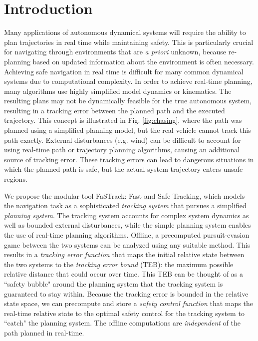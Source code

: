 \section{Introduction}
Many applications of autonomous dynamical systems will require the ability to plan trajectories in real time while maintaining safety.  
This is particularly crucial for navigating through environments that are \textit{a priori} unknown, because re-planning based on updated information about the environment is often necessary. 
Achieving safe navigation in real time is difficult for many common dynamical systems due to computational complexity.
 In order to achieve real-time planning, many algorithms use highly simplified model dynamics or kinematics.  The resulting plans may not be dynamically feasible for the true autonomous system, resulting in a tracking error between the planned path and the executed trajectory.
 This concept is illustrated in Fig. \ref{fig:chasing}, where the path was planned using a simplified planning model, but the real vehicle cannot track this path exactly. 
External disturbances (e.g. wind) can be difficult to account for using real-time path or trajectory planning algorithms, causing an additional source of tracking error. 
These tracking errors can lead to dangerous situations in which the planned path is safe, but the actual system trajectory enters unsafe regions.
 

We propose the modular tool FaSTrack: Fast and Safe Tracking, which models the navigation task as a sophisticated \textit{tracking system} that pursues a simplified \textit{planning system}. 
The tracking system accounts for complex system dynamics as well as bounded external disturbances, while the simple planning system enables the use of real-time planning algorithms. 
Offline, a precomputed pursuit-evasion game between the two systems can be analyzed using any suitable method. 
This results in a \textit{tracking error function} that maps the initial relative state between the two systems to the \textit{tracking error bound} (TEB): the maximum possible relative distance that could occur over time. 
This TEB can be thought of as a ``safety bubble" around the planning system that the tracking system is guaranteed to stay within. 
Because the tracking error is bounded in the relative state space, we can precompute and store a \textit{safety control function} that  maps the real-time relative state to the optimal safety control for the tracking system to ``catch" the planning system. 
The offline computations are \textit{independent} of the path planned in real-time.


